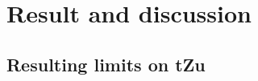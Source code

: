 \begin{comment}

\end{comment}


\section{Result and discussion}
\subsection{Resulting limits on tZu}




